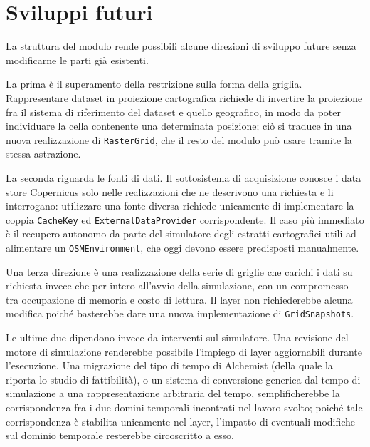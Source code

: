 \section{Sviluppi futuri}
\label{sec:sviluppi-futuri}

La struttura del modulo rende possibili alcune direzioni di sviluppo future senza
modificarne le parti già esistenti.

La prima è il superamento della restrizione sulla forma della griglia.
Rappresentare dataset in proiezione cartografica richiede di invertire la proiezione
fra il sistema di riferimento del dataset e quello geografico, in modo da poter
individuare la cella contenente una determinata posizione; ciò si traduce
in una nuova realizzazione di \texttt{RasterGrid}, che il resto del modulo
può usare tramite la stessa astrazione.

La seconda riguarda le fonti di dati. Il sottosistema di acquisizione
conosce i data store Copernicus solo nelle realizzazioni che ne descrivono
una richiesta e li interrogano: utilizzare una fonte diversa richiede unicamente
di implementare la coppia \texttt{CacheKey} ed \texttt{ExternalDataProvider}
corrispondente. Il caso più immediato è il recupero autonomo da parte del simulatore
degli estratti cartografici utili ad alimentare un \texttt{OSMEnvironment}, che oggi
devono essere predisposti manualmente.

Una terza direzione è una realizzazione della serie di griglie che carichi
i dati su richiesta invece che per intero all'avvio della simulazione,
con un compromesso tra occupazione di memoria e costo di lettura.
Il layer non richiederebbe alcuna modifica poiché basterebbe dare una nuova
implementazione di \texttt{GridSnapshots}.

Le ultime due dipendono invece da interventi sul simulatore.
Una revisione del motore di simulazione renderebbe possibile l'impiego
di layer aggiornabili durante l'esecuzione. Una migrazione del tipo di tempo
di Alchemist (della quale la  riporta lo studio di fattibilità),
o un sistema di conversione generica dal tempo di simulazione
a una rappresentazione arbitraria del tempo, semplificherebbe la corrispondenza
fra i due domini temporali incontrati nel lavoro svolto; poiché tale 
corrispondenza è stabilita unicamente nel layer, l'impatto di eventuali
modifiche sul dominio temporale resterebbe circoscritto a esso.